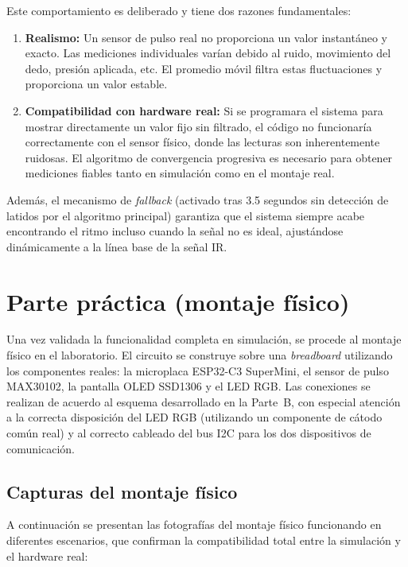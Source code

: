 \documentclass[11pt,a4paper]{article}
\begin{document}
Este comportamiento es deliberado y tiene dos razones fundamentales:

\begin{enumerate}
    \item \textbf{Realismo:} Un sensor de pulso real no proporciona un valor instantáneo y exacto. Las mediciones individuales varían debido al ruido, movimiento del dedo, presión aplicada, etc. El promedio móvil filtra estas fluctuaciones y proporciona un valor estable.
    \item \textbf{Compatibilidad con hardware real:} Si se programara el sistema para mostrar directamente un valor fijo sin filtrado, el código no funcionaría correctamente con el sensor físico, donde las lecturas son inherentemente ruidosas. El algoritmo de convergencia progresiva es necesario para obtener mediciones fiables tanto en simulación como en el montaje real.
\end{enumerate}

Además, el mecanismo de \textit{fallback} (activado tras 3.5 segundos sin detección de latidos por el algoritmo principal) garantiza que el sistema siempre acabe encontrando el ritmo incluso cuando la señal no es ideal, ajustándose dinámicamente a la línea base de la señal IR.

\section{Parte práctica (montaje físico)}

Una vez validada la funcionalidad completa en simulación, se procede al montaje físico en el laboratorio. El circuito se construye sobre una \textit{breadboard} utilizando los componentes reales: la microplaca ESP32-C3 SuperMini, el sensor de pulso MAX30102, la pantalla OLED SSD1306 y el LED RGB. Las conexiones se realizan de acuerdo al esquema desarrollado en la Parte~B, con especial atención a la correcta disposición del LED RGB (utilizando un componente de cátodo común real) y al correcto cableado del bus I2C para los dos dispositivos de comunicación.

\subsection{Capturas del montaje físico}

A continuación se presentan las fotografías del montaje físico funcionando en diferentes escenarios, que confirman la compatibilidad total entre la simulación y el hardware real:
\end{document}
